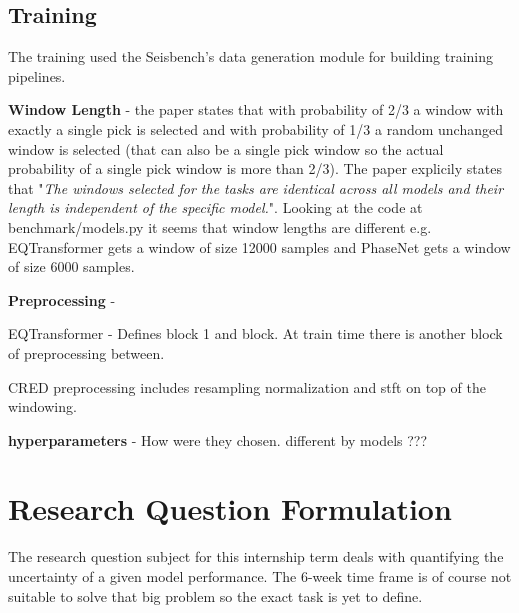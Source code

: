 \documentclass[11pt,a4paper]{article}
\begin{document}
\subsection{Training}
The training used the Seisbench's data generation module for building training pipelines.

\textbf{Window Length} - the paper states that with probability of 2/3 a window with exactly  a single pick is selected and with probability of 1/3 a random unchanged window is selected (that can also be a single pick window so the actual probability of a single pick window is more than 2/3). The paper explicily states that "\textit{The windows selected for the tasks are identical across all models and their length is independent of the specific model.}". Looking at the code at benchmark/models.py it seems that window lengths are different e.g. EQTransformer gets a window of size 12000 samples and PhaseNet gets a window of size 6000 samples.

\textbf{Preprocessing} - 

EQTransformer - Defines  block 1 and block. At train time there is another block of preprocessing between.

CRED  preprocessing includes resampling normalization and stft on top of the windowing. 


\textbf{hyperparameters} - How were they chosen. different by models ???
%
\section{Research Question Formulation}
The research question subject for this internship term deals with quantifying the uncertainty of a given model performance.
The 6-week time frame is of course not suitable to solve that big problem so the exact task is yet to define.
\end{document}
